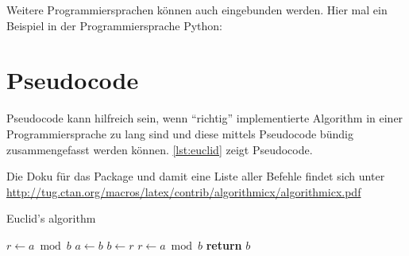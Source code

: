 \pagebreak
Weitere Programmiersprachen können auch eingebunden werden. Hier mal ein Beispiel in der Programmiersprache Python:


\clearpage %

\section{Pseudocode}
Pseudocode kann hilfreich sein, wenn \enquote{richtig} implementierte Algorithm in einer Programmiersprache zu lang sind und diese mittels Pseudocode bündig zusammengefasst werden können. \autoref{lst:euclid} zeigt Pseudocode.

Die Doku für das Package und damit eine Liste aller Befehle findet sich unter \newline
\url{http://tug.ctan.org/macros/latex/contrib/algorithmicx/algorithmicx.pdf}

\begin{algorithm}
	\caption{Euclid's algorithm}\label{lst:euclid}
	\begin{algorithmic}[1]
			\State $r\gets a\bmod b$
				\State $a\gets b$
				\State $b\gets r$
				\State $r\gets a\bmod b$
			\EndWhile\label{euclidendwhile}
			\State \textbf{return} $b$
		\EndProcedure
	\end{algorithmic}
\end{algorithm}